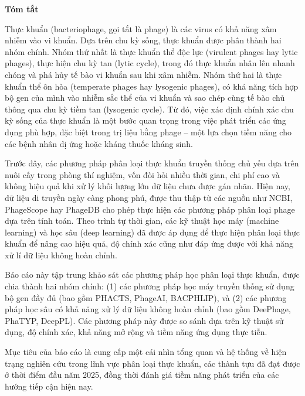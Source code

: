 \begin{center}
\textbf{\large{Tóm tắt}	}
\end{center}


\begin{small}
Thực khuẩn (bacteriophage, gọi tắt là phage) là các virus có khả năng xâm nhiễm vào vi khuẩn. Dựa trên chu kỳ sống, thực khuẩn được phân thành hai nhóm chính. Nhóm thứ nhất là thực khuẩn thể độc lực (virulent phages hay lytic phages), thực hiện chu kỳ tan (lytic cycle), trong đó thực khuẩn nhân lên nhanh chóng và phá hủy tế bào vi khuẩn sau khi xâm nhiễm. Nhóm thứ hai là thực khuẩn thể ôn hòa (temperate phages hay lysogenic phages), có khả năng tích hợp bộ gen của mình vào nhiễm sắc thể của vi khuẩn và sao chép cùng tế bào chủ thông qua chu kỳ tiềm tan (lysogenic cycle). Từ đó, việc xác định chính xác chu kỳ sống của thực khuẩn là một bước quan trọng trong việc phát triển các ứng dụng phù hợp, đặc biệt trong trị liệu bằng phage – một lựa chọn tiềm năng cho các bệnh nhân dị ứng hoặc kháng thuốc kháng sinh.

Trước đây, các phương pháp phân loại thực khuẩn truyền thống chủ yếu dựa trên nuôi cấy trong phòng thí nghiệm, vốn đòi hỏi nhiều thời gian, chi phí cao và không hiệu quả khi xử lý khối lượng lớn dữ liệu chưa được gán nhãn. Hiện nay, dữ liệu di truyền ngày càng phong phú, được thu thập từ các nguồn như NCBI, PhageScope hay PhageDB cho phép thực hiện các phương pháp phân loại phage dựa trên tính toán. Theo trình tự thời gian, các kỹ thuật học máy (machine learning) và học sâu (deep learning) đã được áp dụng để thực hiện phân loại thực khuẩn để nâng cao hiệu quả, độ chính xác cũng như đáp ứng được với khả năng xử lí dữ liệu không hoàn chỉnh.

Báo cáo này tập trung khảo sát các phương pháp học phân loại thực khuẩn, được chia thành hai nhóm chính: (1) các phương pháp học máy truyền thống sử dụng bộ gen đầy đủ (bao gồm PHACTS, PhageAI, BACPHLIP), và (2) các phương pháp học sâu có khả năng xử lý dữ liệu không hoàn chỉnh (bao gồm DeePhage, PhaTYP, DeepPL). Các phương pháp này được so sánh dựa trên kỹ thuật sử dụng, độ chính xác, khả năng mở rộng và tiềm năng ứng dụng thực tiễn.

Mục tiêu của báo cáo là cung cấp một cái nhìn tổng quan và hệ thống về hiện trạng nghiên cứu trong lĩnh vực phân loại thực khuẩn, các thành tựu đã đạt được ở thời điểm đầu năm 2025, đồng thời đánh giá tiềm năng phát triển của các hướng tiếp cận hiện nay.


\end{small}